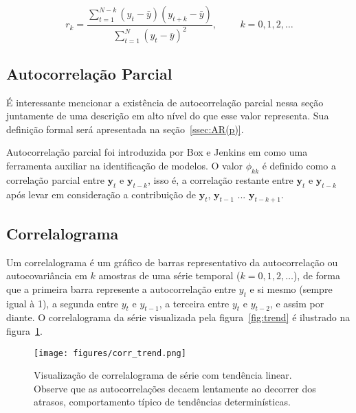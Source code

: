 \begin{equation}\label{eq:autocorr}
    r_k = \frac{\sum_{t=1}^{N-k}(y_t - \bar{y})(y_{t+k}-\bar{y})}{\sum_{t=1}^{N}(y_t - \bar{y})^2}  , \hspace{1cm} k = 0, 1, 2, \dots
\end{equation}

\vspace{1cm}

\subsection{Autocorrelação Parcial}

É interessante mencionar a existência de autocorrelação parcial nessa seção
juntamente de uma descrição em alto nível do que esse valor representa. Sua
definição formal será apresentada na seção~\ref{ssec:AR(p)}.

Autocorrelação parcial foi introduzida por Box e Jenkins em\cite{box} como uma
ferramenta auxiliar na identificação de modelos. O valor $\phi_{kk}$ é
definido como a correlação parcial entre $\mathbf{y}_t$ e $\mathbf{y}_{t - k}$,
isso é, a correlação restante entre $\mathbf{y}_t$ e $\mathbf{y}_{t - k}$ após
levar em consideração a contribuição de $\mathbf{y}_t$, $\mathbf{y}_{t - 1}$
$...$ $\mathbf{y}_{t - k + 1}$.

\subsection{Correlalograma}\label{ssec:correlalogram}

Um correlalograma é um gráfico de barras representativo da autocorrelação ou
autocovariância em $k$ amostras de uma série temporal ($k=0, 1, 2, \dots$), de
forma que a primeira barra represente a autocorrelação entre $y_t$ e si mesmo
(sempre igual à 1), a segunda entre $y_t$ e $y_{t-1}$, a terceira entre $y_t$ e
$y_{t-2}$, e assim por diante. O correlalograma da série visualizada pela
figura~\ref{fig:trend} é ilustrado na figura~\ref{fig:correlalogram}.

\begin{figure}
    \centering
    \texttt{[image: figures/corr\_trend.png]}
    \caption{Visualização de correlalograma de série com tendência linear.
    Observe que as autocorrelações decaem lentamente ao decorrer dos atrasos,
    comportamento típico de tendências determinísticas.}
    \label{fig:correlalogram}
\end{figure}

